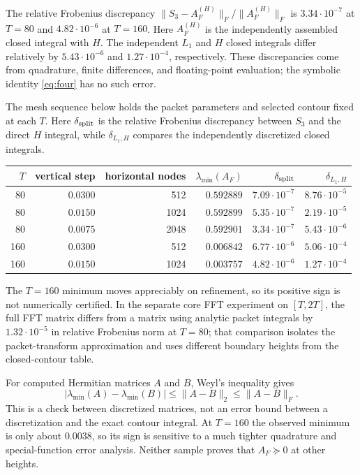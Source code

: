 \documentclass[11pt]{article}
\newcommand{\norm}[1]{\lVert#1\rVert}
\begin{document}
The relative Frobenius discrepancy
$\norm{S_3-A_F^{(H)}}_F/\norm{A_F^{(H)}}_F$ is
$3.34\cdot10^{-7}$ at $T=80$ and $4.82\cdot10^{-6}$ at $T=160$.
Here $A_F^{(H)}$ is the independently assembled closed integral with $H$.
The independent $L_1$ and $H$ closed integrals differ relatively by
$5.43\cdot10^{-6}$ and $1.27\cdot10^{-4}$, respectively. These discrepancies
come from quadrature, finite differences, and floating-point evaluation; the
symbolic identity \eqref{eq:four} has no such error.

The mesh sequence below holds the packet parameters and selected contour
fixed at each $T$. Here $\delta_{\rm split}$ is the relative Frobenius
discrepancy between $S_3$ and the direct $H$ integral, while
$\delta_{L_1,H}$ compares the independently discretized closed integrals.
\begin{center}
\small
\begin{tabular}{@{}r r r r r r@{}}
\toprule
$T$ & vertical step & horizontal nodes & $\lambda_{\min}(A_F)$
& $\delta_{\rm split}$ & $\delta_{L_1,H}$ \\
\midrule
80  & $0.0300$ & 512  & $0.592889$ & $7.09\cdot10^{-7}$ & $8.76\cdot10^{-5}$ \\
80  & $0.0150$ & 1024 & $0.592899$ & $5.35\cdot10^{-7}$ & $2.19\cdot10^{-5}$ \\
80  & $0.0075$ & 2048 & $0.592901$ & $3.34\cdot10^{-7}$ & $5.43\cdot10^{-6}$ \\
160 & $0.0300$ & 512  & $0.006842$ & $6.77\cdot10^{-6}$ & $5.06\cdot10^{-4}$ \\
160 & $0.0150$ & 1024 & $0.003757$ & $4.82\cdot10^{-6}$ & $1.27\cdot10^{-4}$ \\
\bottomrule
\end{tabular}
\end{center}
The $T=160$ minimum moves appreciably on refinement, so its positive sign is
not numerically certified. In the separate core FFT experiment on $[T,2T]$,
the full FFT matrix differs from a matrix using analytic packet integrals by
$1.32\cdot10^{-5}$ in relative Frobenius norm at $T=80$; that comparison
isolates the packet-transform approximation and uses different boundary
heights from the closed-contour table.

For computed Hermitian matrices $A$ and $B$, Weyl's inequality gives
\begin{equation}
|\lambda_{\min}(A)-\lambda_{\min}(B)|
\le\norm{A-B}_2\le\norm{A-B}_F.
\label{eq:weyl}
\end{equation}
This is a check between discretized matrices, not an error bound between a
discretization and the exact contour integral. At $T=160$ the observed
minimum is only about $0.0038$, so its sign is sensitive to a much tighter
quadrature and special-function error analysis. Neither sample proves that
$A_F\succeq0$ at other heights.
\end{document}
